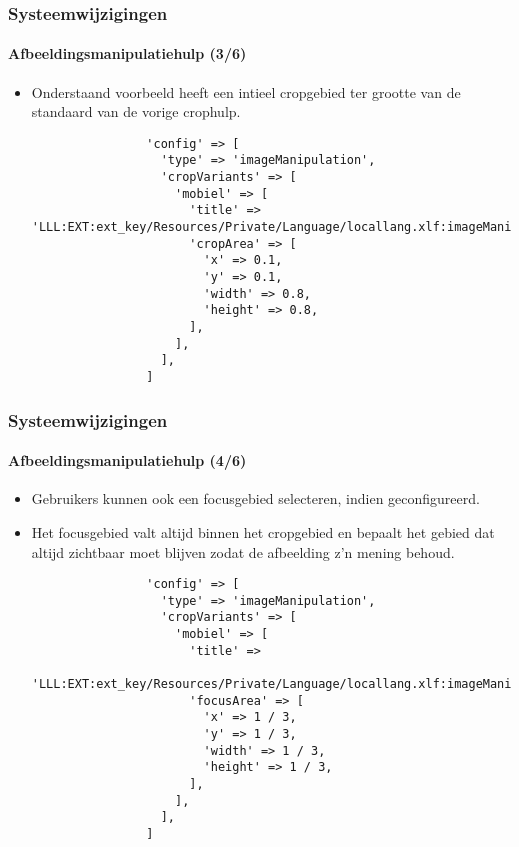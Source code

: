 \begin{frame}[fragile]
	\frametitle{Systeemwijzigingen}
	\framesubtitle{Afbeeldingsmanipulatiehulp (3/6)}

	\lstset{basicstyle=\tiny\ttfamily}

	\begin{itemize}

		\item Onderstaand voorbeeld heeft een intieel cropgebied ter
		 	grootte van de standaard van de vorige crophulp.

			\begin{lstlisting}
				'config' => [
				  'type' => 'imageManipulation',
				  'cropVariants' => [
				    'mobiel' => [
				      'title' => 'LLL:EXT:ext_key/Resources/Private/Language/locallang.xlf:imageManipulation.mobile',
				      'cropArea' => [
				        'x' => 0.1,
				        'y' => 0.1,
				        'width' => 0.8,
				        'height' => 0.8,
				      ],
				    ],
				  ],
				]
			\end{lstlisting}

	\end{itemize}

\end{frame}


\begin{frame}[fragile]
	\frametitle{Systeemwijzigingen}
	\framesubtitle{Afbeeldingsmanipulatiehulp (4/6)}

	\lstset{basicstyle=\tiny\ttfamily}

	\begin{itemize}
		\item Gebruikers kunnen ook een focusgebied selecteren, indien geconfigureerd.
		\item Het focusgebied valt altijd binnen het cropgebied en bepaalt het gebied dat
		 	altijd zichtbaar moet blijven zodat de afbeelding z'n mening behoud.

			\begin{lstlisting}
				'config' => [
				  'type' => 'imageManipulation',
				  'cropVariants' => [
				    'mobiel' => [
				      'title' =>
				        'LLL:EXT:ext_key/Resources/Private/Language/locallang.xlf:imageManipulation.mobile',
				      'focusArea' => [
				        'x' => 1 / 3,
				        'y' => 1 / 3,
				        'width' => 1 / 3,
				        'height' => 1 / 3,
				      ],
				    ],
				  ],
				]
			\end{lstlisting}

	\end{itemize}

\end{frame}

